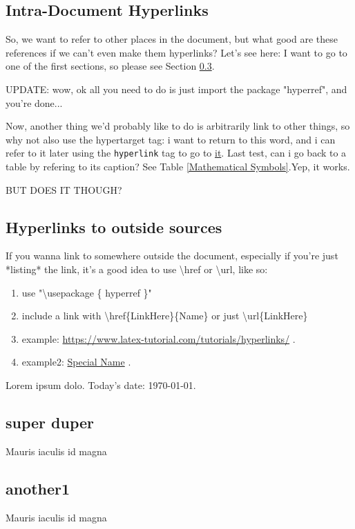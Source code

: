 \documentclass[a4paper,12pt]{article} %
\begin{document}
\subsection{Intra-Document Hyperlinks}
So, we want to refer to other places in the document, but what good are these references if we can't even make them hyperlinks? Let's see here: I want to go to one of the first sections, so please see Section \ref{super duper}. 

UPDATE: wow, ok all you need to do is just import the package "hyperref", and you're done...

Now, another thing we'd probably like to do is arbitrarily link to other things, so why not also use the hypertarget tag: 
i want to return to this \hypertarget{special_word}{word}, and i can refer to it later using the \texttt{hyperlink} tag to go to \hyperlink{special_word}{it}. 
Last test, can i go back to a table by refering to its caption? See Table \ref{Mathematical Symbols}.Yep, it works.

BUT DOES IT THOUGH?

\subsection{Hyperlinks to outside sources}
If you wanna link to somewhere outside the document, especially if you're just *listing* the link, it's a good idea to use \textbackslash href or \textbackslash url, like so: 

\begin{enumerate} \itemsep=-0.5em
\item use "\textbackslash usepackage \{ hyperref \}"
\item include a link with \textbackslash href\{LinkHere\}\{Name\} or just \textbackslash url\{LinkHere\}
\item example: \url{https://www.latex-tutorial.com/tutorials/hyperlinks/} .
\item example2: \href{https://www.latex-tutorial.com/tutorials/hyperlinks/}{Special Name} .

\end{enumerate}


Lorem ipsum dolo. Today's date: \today.
\subsection{super duper}
\label{super duper}
Mauris iaculis id magna 
\subsection{another1}
Mauris iaculis id magna 
\end{document}
